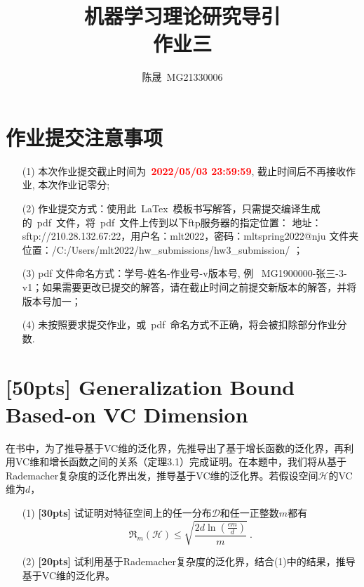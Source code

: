 \documentclass[a4paper,UTF8]{article}
\numberwithin{equation}{section}
\begin{document}
	
	\title{机器学习理论研究导引\\
		作业三}
	\author{陈晟\, MG21330006} 
	\maketitle
	
	\section*{作业提交注意事项}
	
	\begin{tcolorbox}
		\begin{enumerate}
			\item[(1)] 本次作业提交截止时间为~\textcolor{red}{\textbf{2022/05/03  23:59:59}}, 截止时间后不再接收作业, 本次作业记零分; 
			\item[(2)] 作业提交方式：使用此~LaTex~模板书写解答，只需提交编译生成的~pdf~文件，将~pdf~文件上传到以下ftp服务器的指定位置：
			\newline 地址：sftp://210.28.132.67:22，用户名：mlt2022，密码：mltspring2022@nju
			\newline 文件夹位置：/C:/Users/mlt2022/hw\_submissions/hw3\_submission/  ；
			\item[(3)] pdf 文件命名方式：学号-姓名-作业号-v版本号, 例~ MG1900000-张三-3-v1；如果需要更改已提交的解答，请在截止时间之前提交新版本的解答，并将版本号加一；
			\item[(4)] 未按照要求提交作业，或~pdf~命名方式不正确，将会被扣除部分作业分数. 
		\end{enumerate}
	\end{tcolorbox}
	
	\newpage
	
	\section{[50pts] Generalization Bound Based-on VC Dimension} 
	在书中，为了推导基于VC维的泛化界，先推导出了基于增长函数的泛化界，再利用VC维和增长函数之间的关系（定理3.1）完成证明。在本题中，我们将从基于Rademacher复杂度的泛化界出发，推导基于VC维的泛化界。若假设空间$\mathcal{H}$的VC维为$d$，
	\begin{enumerate}
		\item[(1)]\textbf{[30pts]} 试证明对特征空间上的任一分布$\mathcal{D}$和任一正整数$m$都有
		$$ \mathfrak{R}_m(\mathcal{H})\leq\sqrt{\frac{2d\ln\left(\frac{em}{d}\right)}{m}}~. $$
		\item[(2)]\textbf{[20pts]} 试利用基于Rademacher复杂度的泛化界，结合(1)中的结果，推导基于VC维的泛化界。
	\end{enumerate}
	
\end{document}
